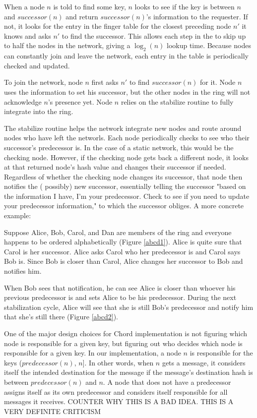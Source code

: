 \documentclass[conference, compsocconf, letterpaper]{IEEEtran}
\begin{document}
When a node $n$ is told to find some key, $n$ looks to see if the key is between $n$ and $successor(n)$ and return $successor(n)$'s information to the requester. If not, it looks for the entry in the finger table for the closest preceding node $n'$ it knows and asks $n'$ to find the successor.  This allows each step in the to skip up to half the nodes in the network, giving a $\log_2(n)$ lookup time.  Because nodes can constantly join and leave the network, each entry in the table is periodically checked and updated. 

To join the network, node $n$ first asks $n'$ to find $successor(n)$ for it.  Node $n$ uses the information to set his successor, but the other nodes in the ring will not acknowledge $n$'s presence yet.  Node $n$ relies on the stabilize routine to fully integrate into the ring.

The stabilize routine helps the network integrate new nodes and route around nodes who have left the networls. Each node periodically checks to see who their successor's predecessor is.  In the case of a static network, this would be the checking node.  However, if the checking node gets back a different node, it looks at that returned node's hash value and changes their successor if needed.  Regardless of whether the checking node changes its successor, that node then notifies the ( possibly) new successor,  essentially telling the successor "based on the information I have, I'm your predecessor.  Check to see if you need to update your predecessor information," to which the successor obliges.  A more concrete example:


Suppose Alice, Bob, Carol, and Dan are members of the ring and everyone happens to be ordered alphabetically (Figure \ref{abcd1}). Alice is quite sure that Carol is her successor.  Alice asks Carol who her predecessor is and Carol says Bob is.  Since Bob is closer than Carol, Alice changes her successor to Bob and notifies him.  

When Bob sees that notification, he can see Alice is closer than whoever his previous predecessor is and sets Alice to be his predecessor.  During the next stabilization cycle, Alice will see that she is still Bob's predecessor and notify him that she's still there (Figure \ref{abcd2}).

One of the major design choices for Chord implementation is not figuring which node is responsible for a given key, but figuring out who decides which node is responsible for a given key.  In our implementation, a node $n$ is responsible for the keys ($predecessor(n)$, $n$].  In other words, when $n$ gets a message, it considers itself the intended destination for the message if the message's destination hash is between $predecessor(n)$ and $n$.  A node that does not have a predecessor assigns itself as its own predecessor and considers itself responsible for all messages it receives.  COUNTER WHY THIS IS A BAD IDEA.  THIS IS A VERY DEFINITE CRITICISM 
\end{document}
